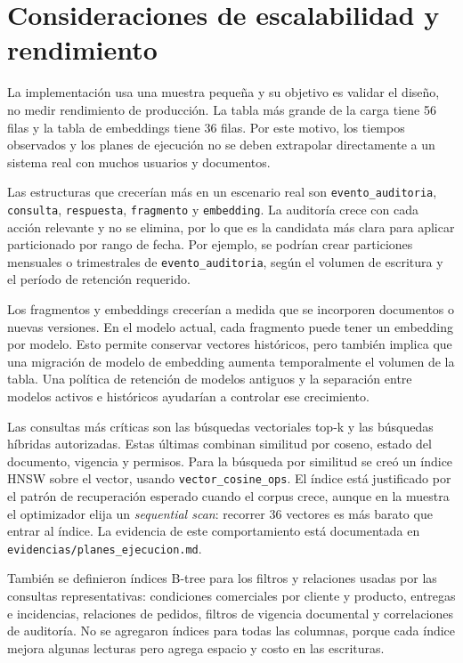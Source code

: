 \section{Consideraciones de escalabilidad y rendimiento}

La implementación usa una muestra pequeña y su objetivo es validar el diseño, no medir rendimiento de producción. La tabla más grande de la carga tiene 56 filas y la tabla de embeddings tiene 36 filas. Por este motivo, los tiempos observados y los planes de ejecución no se deben extrapolar directamente a un sistema real con muchos usuarios y documentos.

Las estructuras que crecerían más en un escenario real son \texttt{evento\_auditoria}, \texttt{consulta}, \texttt{respuesta}, \texttt{fragmento} y \texttt{embedding}. La auditoría crece con cada acción relevante y no se elimina, por lo que es la candidata más clara para aplicar particionado por rango de fecha. Por ejemplo, se podrían crear particiones mensuales o trimestrales de \texttt{evento\_auditoria}, según el volumen de escritura y el período de retención requerido.

Los fragmentos y embeddings crecerían a medida que se incorporen documentos o nuevas versiones. En el modelo actual, cada fragmento puede tener un embedding por modelo. Esto permite conservar vectores históricos, pero también implica que una migración de modelo de embedding aumenta temporalmente el volumen de la tabla. Una política de retención de modelos antiguos y la separación entre modelos activos e históricos ayudarían a controlar ese crecimiento.

Las consultas más críticas son las búsquedas vectoriales top-k y las búsquedas híbridas autorizadas. Estas últimas combinan similitud por coseno, estado del documento, vigencia y permisos. Para la búsqueda por similitud se creó un índice HNSW sobre el vector, usando \texttt{vector\_cosine\_ops}. El índice está justificado por el patrón de recuperación esperado cuando el corpus crece, aunque en la muestra el optimizador elija un \textit{sequential scan}: recorrer 36 vectores es más barato que entrar al índice. La evidencia de este comportamiento está documentada en \texttt{evidencias/planes\_ejecucion.md}.

También se definieron índices B-tree para los filtros y relaciones usadas por las consultas representativas: condiciones comerciales por cliente y producto, entregas e incidencias, relaciones de pedidos, filtros de vigencia documental y correlaciones de auditoría. No se agregaron índices para todas las columnas, porque cada índice mejora algunas lecturas pero agrega espacio y costo en las escrituras.

